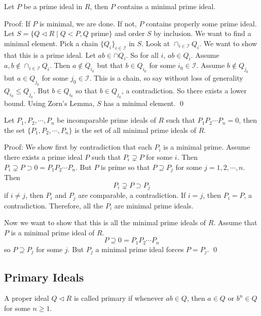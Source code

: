 \begin{thm}
Let $P$ be a prime ideal in $R$, then $P$ contains a minimal prime ideal.
\end{thm}

Proof: If $P$ is minimal, we are done. If not, $P$ contains properly some prime ideal. Let $S=\{Q\lhd R\;|\; Q <P,Q \text{ prime}\}$ and order $S$ by inclusion. We want to find a minimal element. Pick a chain $\{Q_i\}_{i \in \mathcal{I}}$ in $S$. Look at $\cap_{i \in \mathcal{I}} Q_i$. We want to show that this is a prime ideal. Let $ab \in \cap Q_i$. So for all $i$, $ab \in Q_i$. Assume $a,b \notin \cap_{i \in \mathcal{I}} Q_i$. Then $a \notin Q_{i_0}$ but that $b \in Q_{i_0}$ for some $i_0 \in \mathcal{I}$. Assume $b \notin Q_{j_0}$ but $a \in Q_{j_0}$ for some $j_0 \in \mathcal{I}$. This is a chain, so say without loss of generality $Q_{i_0} \leq Q_{j_0}$. But $b \in Q_{i_0}$ so that $b \in Q_{j_0}$, a contradiction. So there exists a lower bound. Using Zorn's Lemma, $S$ has a minimal element. \qed \\

\begin{lem}
Let $P_1,P_2,\cdots,P_n$ be incomparable prime ideals of $R$ such that $P_1P_2\cdots P_n=0$, then the set $\{P_1,P_2,\cdots,P_n\}$ is the set of all minimal prime ideals of $R$.
\end{lem}

Proof: We show first by contradiction that each $P_i$ is a minimal prime. Assume there exists a prime ideal $P$ such that $P_i \supsetneq P$ for some $i$. Then $P_i \supsetneq P \supset 0=P_1P_2\cdots P_n$. But $P$ is prime so that $P \supseteq P_j$ for some $j=1,2,\cdots,n$. Then
\[
P_i \supsetneq P \supset P_j
\]
if $i \neq j$, then $P_i$ and $P_j$ are comparable, a contradiction. If $i=j$, then $P_i=P$, a contradiction. Therefore, all the $P_i$ are minimal prime ideals.

Now we want to show that this is all the minimal prime ideals of $R$. Assume that $P$ is a minimal prime ideal of $R$.
\[
P \supseteq 0 =P_1P_2\cdots P_n
\]
so $P\supseteq P_j$ for some $j$. But $P_j$ a minimal prime ideal forces $P=P_j$. \qed \\

\subsection{Primary Ideals}

\begin{dfn}
A proper ideal $Q \lhd R$ is called primary if whenever $ab \in Q$, then $a \in Q$ or $b^n \in Q$ for some $n\geq 1$. 
\end{dfn}

